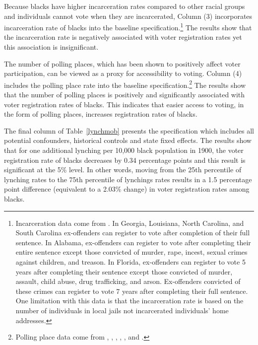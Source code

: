 \documentclass[AEJ, finalmode]{AEA}
\begin{document}
Because blacks have higher incarceration rates compared to other racial groups and individuals cannot vote when they are incarcerated, Column (3) incorporates incarceration rate of blacks into the baseline specification.\footnote{Incarceration data come from . In Georgia, Louisiana, North Carolina, and South Carolina ex-offenders can register to vote after completion of their full sentence. In Alabama, ex-offenders can register to vote after completing their entire sentence except those convicted of murder, rape, incest, sexual crimes against children, and treason. In Florida, ex-offenders can register to vote 5 years after completing their sentence except those convicted of murder, assault, child abuse, drug trafficking, and arson. Ex-offenders convicted of these crimes can register to vote 7 years after completing their full sentence. One limitation with this data is that the incarceration rate is based on the number of individuals in local jails not incarcerated individuals' home addresses.} The results show that the incarceration rate is negatively associated with voter registration rates yet this association is insignificant. 

The number of polling places, which has been shown to positively affect voter participation, can be viewed as a proxy for accessibility to voting. Column (4) includes the polling place rate into the baseline specification.\footnote{Polling place data come from , , , , , and .} The results show that the number of polling places is positively and significantly associated with voter registration rates of blacks. This indicates that easier access to voting, in the form of polling places, increases registration rates of blacks. 

The final column of Table~\ref{lynchmob} presents the specification which includes all potential confounders, historical controls and state fixed effects. The results show that for one additional lynching per 10,000 black population in 1900, the voter registration rate of blacks decreases by 0.34 percentage points and this result is significant at the 5\% level. In other words, moving from the 25th percentile of lynching rates to the 75th percentile of lynchings rates results in a 1.5 percentage point difference (equivalent to a 2.03\% change) in voter registration rates among blacks.
\end{document}
